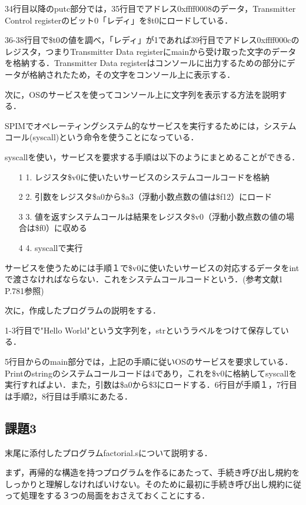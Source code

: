 \documentclass[a4j]{jarticle}
\begin{document}
34行目以降のputc部分では，35行目でアドレス0xffff0008のデータ，Transmitter Control registerのビット0「レディ」を\$t0にロードしている．

36-38行目で\$t0の値を調べ，「レディ」が1であれば39行目でアドレス0xffff000cのレジスタ，つまりTransmitter Data registerにmainから受け取った文字のデータを格納する．Transmitter Data registerはコンソールに出力するための部分にデータが格納されたため，その文字をコンソール上に表示する．

次に，OSのサービスを使ってコンソール上に文字列を表示する方法を説明する．

SPIMでオペレーティングシステム的なサービスを実行するためには，システムコール(syscall)という命令を使うことになっている．

syscallを使い，サービスを要求する手順は以下のようにまとめることができる．

\begin{itemize}
\item[1]1. レジスタ\$v0に使いたいサービスのシステムコールコードを格納
\item[2]2. 引数をレジスタ\$a0から\$a3（浮動小数点数の値は\$f12）にロード
\item[3]3. 値を返すシステムコールは結果をレジスタ\$v0（浮動小数点数の値の場合は\$f0）に収める
\item[4]4. syscallで実行
\end{itemize}


サービスを使うためには手順１で\$v0に使いたいサービスの対応するデータをintで渡さなければならない．これをシステムコールコードという．(参考文献1 P.781参照)

次に，作成したプログラムの説明をする．

1-3行目で"Hello World"という文字列を，strというラベルをつけて保存している．

5行目からのmain部分では，上記の手順に従いOSのサービスを要求している．Printのstringのシステムコールコードは4であり，これを\$v0に格納してsyscallを実行すればよい．また，引数は\$a0から\$3にロードする．6行目が手順１，7行目は手順2，8行目は手順3にあたる．


\subsection{課題3}

末尾に添付したプログラムfactorial.sについて説明する．

まず，再帰的な構造を持つプログラムを作るにあたって、手続き呼び出し規約をしっかりと理解しなければいけない。そのために最初に手続き呼び出し規約に従って処理をする３つの局面をおさえておくことにする．
\end{document}
